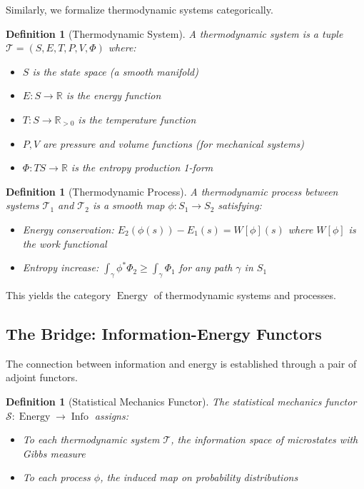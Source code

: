 \documentclass[12pt]{article}
\newtheorem{definition}[theorem]{Definition}
\DeclareMathOperator{\Info}{Info}
\DeclareMathOperator{\Energy}{Energy}
\begin{document}
Similarly, we formalize thermodynamic systems categorically.

\begin{definition}[Thermodynamic System]
A thermodynamic system is a tuple $\mathcal{T} = (S, E, T, P, V, \Phi)$ where:
\begin{itemize}
\item $S$ is the state space (a smooth manifold)
\item $E: S \to \mathbb{R}$ is the energy function
\item $T: S \to \mathbb{R}_{>0}$ is the temperature function
\item $P, V$ are pressure and volume functions (for mechanical systems)
\item $\Phi: TS \to \mathbb{R}$ is the entropy production 1-form
\end{itemize}
\end{definition}

\begin{definition}[Thermodynamic Process]
A thermodynamic process between systems $\mathcal{T}_1$ and $\mathcal{T}_2$ is a smooth map $\phi: S_1 \to S_2$ satisfying:
\begin{itemize}
\item Energy conservation: $E_2(\phi(s)) - E_1(s) = W[\phi](s)$ where $W[\phi]$ is the work functional
\item Entropy increase: $\int_{\gamma} \phi^*\Phi_2 \geq \int_{\gamma} \Phi_1$ for any path $\gamma$ in $S_1$
\end{itemize}
\end{definition}

This yields the category $\Energy$ of thermodynamic systems and processes.

\subsection{The Bridge: Information-Energy Functors}

The connection between information and energy is established through a pair of adjoint functors.

\begin{definition}[Statistical Mechanics Functor]
The statistical mechanics functor $\mathcal{S}: \Energy \to \Info$ assigns:
\begin{itemize}
\item To each thermodynamic system $\mathcal{T}$, the information space of microstates with Gibbs measure
\item To each process $\phi$, the induced map on probability distributions
\end{itemize}
\end{definition}
\end{document}
